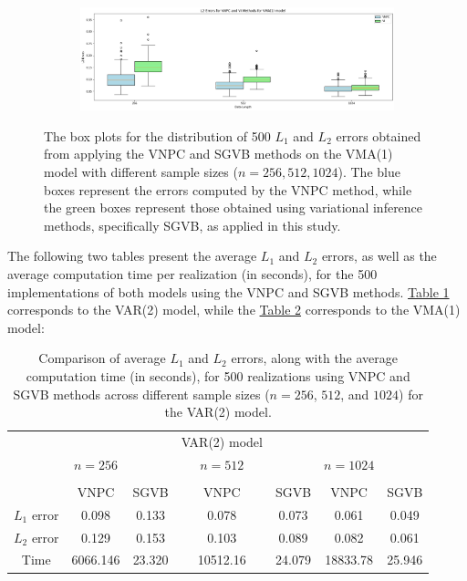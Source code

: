 \documentclass[12pt,a4paper]{article}
\begin{document}
\begin{figure}[H]
\begin{subfigure}{\textwidth} %
  \centering
  \includegraphics[width=18cm]{L2 Errors for VNPC and VI Methods for VMA(1) model.png}
\end{subfigure}

\caption{The box plots for the distribution of 500 $L_1$ and $L_2$ errors obtained from applying the VNPC and SGVB methods on the VMA(1) model with different sample sizes ($n = 256, 512, 1024$). The blue boxes represent the errors computed by the VNPC method, while the green boxes represent those obtained using variational inference methods, specifically SGVB, as applied in this study.}
\label{plot l1l2 var2}
\end{figure}

The following two tables present the average $L_1$ and $L_2$ errors, as well as the average computation time per realization (in seconds), for the 500 implementations of both models using the VNPC and SGVB methods. \hyperref[table l1l2 var2]{Table 1} corresponds to the VAR(2) model, while the \hyperref[table l1l2 vma1]{Table 2} corresponds to the VMA(1) model:
\begin{table}[h]
\centering
\begin{tabular}{ccccccc}
\hline
\quad & \quad & \quad & {VAR(2) model} & \quad & \quad & \quad\\
\quad & $n=256$ & \quad & $n = 512$ & \quad & $n = 1024$\\
\hline\\
\quad & {VNPC} & {SGVB} & {VNPC} & {SGVB} & {VNPC} & {SGVB}\\
{$L_1$ error} & 0.098 & 0.133 & 0.078 & 0.073 & 0.061 & 0.049\\
{$L_2$ error} & 0.129 & 0.153 & 0.103 & 0.089 & 0.082 & 0.061\\
{Time} & 6066.146 & 23.320 & 10512.16 & 24.079 & 18833.78 & 25.946\\
\hline
\end{tabular}
\caption{Comparison of average $L_1$ and $L_2$ errors, along with the average computation time (in seconds), for 500 realizations using VNPC and SGVB methods across different sample sizes ($n=256$, $512$, and $1024$) for the VAR(2) model.}
\label{table l1l2 var2} 
\end{table}
\end{document}

